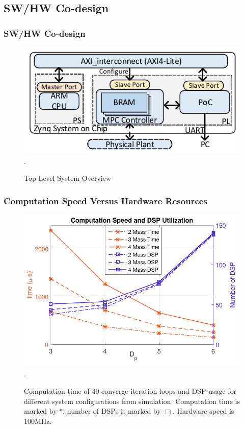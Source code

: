 \documentclass{beamer}
\begin{document}
\subsection{SW/HW Co-design}
\begin{frame}
\frametitle{SW/HW Co-design}
\begin{figure}[t]
\centering
\captionsetup{justification=centering}
\includegraphics[scale=.84]{../ASAP_17/figure/copro.pdf}
\DeclareGraphicsExtensions.
\caption{Top Level System Overview\label{fig_copro}}
\end{figure}

\end{frame}


\begin{frame}
\frametitle{Computation Speed Versus Hardware Resources}
\begin{figure}[t]
\centering
\captionsetup{justification=centering}
\includegraphics[scale=.65]{../ASAP_17/figure/dsp.pdf}
\DeclareGraphicsExtensions.
\caption{Computation time of 40 converge iteration loops and DSP usage for different system configurations from simulation. Computation time is marked by $\ast$, number of DSPs is marked by $\Box$. Hardware speed is 100MHz.\label{fig_ct}}
\end{figure}

\end{frame}
\end{document}
